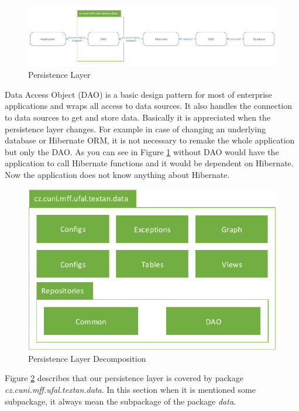 \begin{figure}[!htb]
        \centering
        \includegraphics[width=\textwidth]{Images/PersistentLayer}
        \caption{Persistence Layer}
        \label{fig:PersistentLayer}
\end{figure}

Data Access Object (DAO) is a basic design pattern for most of enterprise
applications and wraps all access to data sources. It also handles the
connection to data sources to get and store data. Basically
it is appreciated when the persistence layer changes. For example in case of changing
an underlying database or Hibernate ORM, it is not necessary to remake the whole
application but only the DAO. As you can see in Figure
\ref{fig:PersistentLayer} without DAO would have the application
to call Hibernate functions and it would be dependent on Hibernate. Now the
application does not know anything about Hibernate.

\begin{figure}[!htb]
        \centering
        \includegraphics{Images/DataDecomposition}
        \caption{Persistence Layer Decomposition}
        \label{fig:DataDecomposition}
\end{figure}

Figure \ref{fig:DataDecomposition} describes that our persistence layer is
covered by package \emph{cz.\-cuni.\-mff.\-ufal.\-textan.\-data}. In this section when it is
mentioned some subpackage, it always mean the subpackage of the package \emph{data}.

